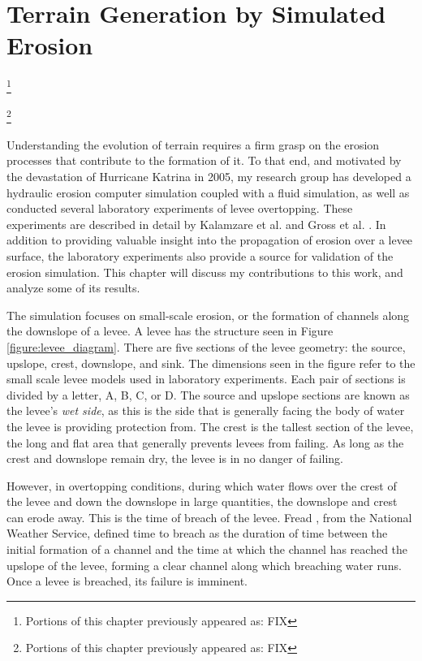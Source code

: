 \chapter{Terrain Generation by Simulated Erosion}
\label{chapter:ErosionSimulation}



\let\thefootnote\relax\footnote{Portions of this chapter previously appeared as: FIX  }

\let\thefootnote\relax\footnote{Portions of this chapter previously appeared as: FIX  }





Understanding the evolution of terrain requires a firm grasp on the erosion processes that contribute to the formation of it. To that end, and motivated by the devastation of Hurricane Katrina in 2005, 
my research group
has
developed a hydraulic erosion computer simulation coupled with a fluid simulation, as well as conducted several laboratory experiments of levee overtopping. 
These experiments are described in detail by Kalamzare et al. \cite{Kamalzare-ValidationOfErosionModeling} and Gross et al. \cite{gross_icse_2010}.
In addition to providing valuable insight into the propagation of erosion over a levee surface, the laboratory experiments also provide a source for validation of the erosion simulation. 
This chapter will discuss my contributions to this work, and analyze some of its results.

The simulation focuses on small-scale erosion, or the formation of channels along the downslope of a levee. A levee has the structure seen in Figure \ref{figure:levee_diagram}. There are five sections of the levee geometry: the source, upslope, crest, downslope, and sink. The dimensions seen in the figure refer to the small scale levee models used in laboratory experiments. Each pair of sections is divided by a letter, A, B, C, or D. The source and upslope sections are known as the levee's \emph{wet side}, as this is the side that is generally facing the body of water the levee is providing protection from. The crest is the tallest section of the levee, the long and flat area that generally prevents levees from failing. As long as the crest and downslope remain dry, the levee is in no danger of failing. 

However, in overtopping conditions, during which water flows over the crest of the levee and down the downslope in large quantities, the downslope and crest can erode away. This is the time of breach of the levee. Fread \cite{DAMBRK_REPORT}, from the National Weather Service, defined time to breach as the duration of time between the initial formation of a channel and the time at which the channel has reached the upslope of the levee, forming a clear channel along which breaching water runs. Once a levee is breached, its failure is imminent. 

